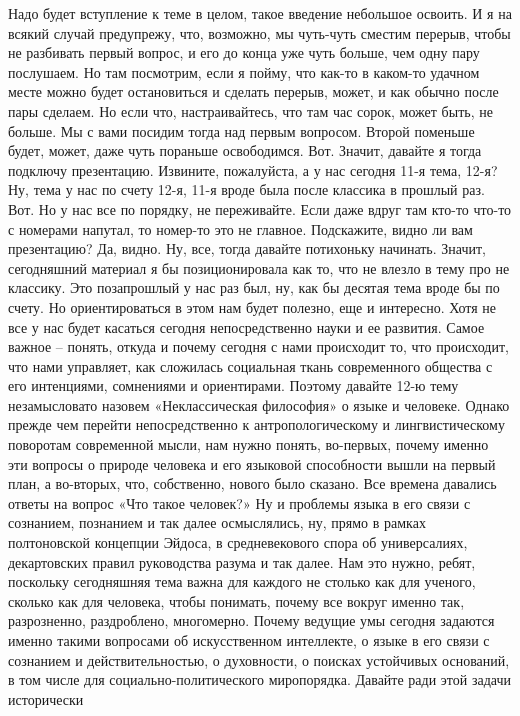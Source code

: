  Надо будет вступление к теме в целом, такое введение небольшое освоить. И я на
всякий случай предупрежу, что, возможно, мы чуть-чуть сместим перерыв, чтобы не
разбивать первый вопрос, и его до конца уже чуть больше, чем одну пару
послушаем. Но там посмотрим, если я пойму, что как-то в каком-то удачном месте
можно будет остановиться и сделать перерыв, может, и как обычно после пары
сделаем. Но если что, настраивайтесь, что там час сорок, может быть, не больше.
Мы с вами посидим тогда над первым вопросом. Второй поменьше будет, может, даже
чуть пораньше освободимся. Вот. Значит, давайте я тогда подключу презентацию.
Извините, пожалуйста, а у нас сегодня 11-я тема, 12-я? Ну, тема у нас по счету
12-я, 11-я вроде была после классика в прошлый раз. Вот. Но у нас все по
порядку, не переживайте. Если даже вдруг там кто-то что-то с номерами напутал,
то номер-то это не главное. Подскажите, видно ли вам презентацию? Да, видно. Ну,
все, тогда давайте потихоньку начинать. Значит, сегодняшний материал я бы
позиционировала как то, что не влезло в тему про не классику. Это позапрошлый у
нас раз был, ну, как бы десятая тема вроде бы по счету. Но ориентироваться в
этом нам будет полезно, еще и интересно. Хотя не все у нас будет касаться
сегодня непосредственно науки и ее развития. Самое важное – понять, откуда и
почему сегодня с нами происходит то, что происходит, что нами управляет, как
сложилась социальная ткань современного общества с его интенциями, сомнениями и
ориентирами. Поэтому давайте 12-ю тему незамысловато назовем «Неклассическая
философия» о языке и человеке. Однако прежде чем перейти непосредственно к
антропологическому и лингвистическому поворотам современной мысли, нам нужно
понять, во-первых, почему именно эти вопросы о природе человека и его языковой
способности вышли на первый план, а во-вторых, что, собственно, нового было
сказано. Все времена давались ответы на вопрос «Что такое человек?» Ну и
проблемы языка в его связи с сознанием, познанием и так далее осмыслялись, ну,
прямо в рамках полтоновской концепции Эйдоса, в средневекового спора об
универсалиях, декартовских правил руководства разума и так далее. Нам это нужно,
ребят, поскольку сегодняшняя тема важна для каждого не столько как для ученого,
сколько как для человека, чтобы понимать, почему все вокруг именно так,
разрозненно, раздроблено, многомерно. Почему ведущие умы сегодня задаются именно
такими вопросами об искусственном интеллекте, о языке в его связи с сознанием и
действительностью, о духовности, о поисках устойчивых оснований, в том числе для
социально-политического миропорядка. Давайте ради этой задачи исторически
